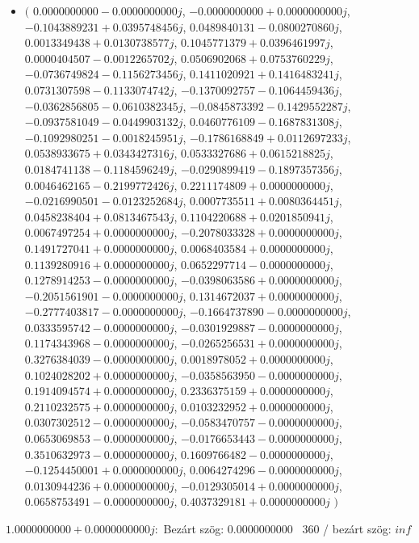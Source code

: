 \documentclass[14pt,a4paper]{article}
\begin{document}
\begin{itemize}
\item
$\big($
$0.0000000000-0.0000000000j$, $-0.0000000000+0.0000000000j$, $-0.1043889231+0.0395748456j$, $0.0489840131-0.0800270860j$, $0.0013349438+0.0130738577j$, $0.1045771379+0.0396461997j$, $0.0000404507-0.0012265702j$, $0.0506902068+0.0753760229j$, $-0.0736749824-0.1156273456j$, $0.1411020921+0.1416483241j$, $0.0731307598-0.1133074742j$, $-0.1370092757-0.1064459436j$, $-0.0362856805-0.0610382345j$, $-0.0845873392-0.1429552287j$, $-0.0937581049-0.0449903132j$, $0.0460776109-0.1687831308j$, $-0.1092980251-0.0018245951j$, $-0.1786168849+0.0112697233j$, $0.0538933675+0.0343427316j$, $0.0533327686+0.0615218825j$, $0.0184741138-0.1184596249j$, $-0.0290899419-0.1897357356j$, $0.0046462165-0.2199772426j$, $0.2211174809+0.0000000000j$, $-0.0216990501-0.0123252684j$, $0.0007735511+0.0080364451j$, $0.0458238404+0.0813467543j$, $0.1104220688+0.0201850941j$, $0.0067497254+0.0000000000j$, $-0.2078033328+0.0000000000j$, $0.1491727041+0.0000000000j$, $0.0068403584+0.0000000000j$, $0.1139280916+0.0000000000j$, $0.0652297714-0.0000000000j$, $0.1278914253-0.0000000000j$, $-0.0398063586+0.0000000000j$, $-0.2051561901-0.0000000000j$, $0.1314672037+0.0000000000j$, $-0.2777403817-0.0000000000j$, $-0.1664737890-0.0000000000j$, $0.0333595742-0.0000000000j$, $-0.0301929887-0.0000000000j$, $0.1174343968-0.0000000000j$, $-0.0265256531+0.0000000000j$, $0.3276384039-0.0000000000j$, $0.0018978052+0.0000000000j$, $0.1024028202+0.0000000000j$, $-0.0358563950-0.0000000000j$, $0.1914094574+0.0000000000j$, $0.2336375159+0.0000000000j$, $0.2110232575+0.0000000000j$, $0.0103232952+0.0000000000j$, $0.0307302512-0.0000000000j$, $-0.0583470757-0.0000000000j$, $0.0653069853-0.0000000000j$, $-0.0176653443-0.0000000000j$, $0.3510632973-0.0000000000j$, $0.1609766482-0.0000000000j$, $-0.1254450001+0.0000000000j$, $0.0064274296-0.0000000000j$, $0.0130944236+0.0000000000j$, $-0.0129305014+0.0000000000j$, $0.0658753491-0.0000000000j$, $0.4037329181+0.0000000000j$
$\big)$
\end{itemize}
$1.0000000000+0.0000000000j$:\
Bezárt szög: $0.0000000000$ \
360 / bezárt szög: $inf$\
\end{document}
